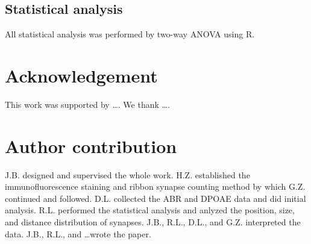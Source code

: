 \documentclass[11pt]{article}
\begin{document}
\subsection {Statistical analysis}
All statistical analysis was performed by two-way ANOVA using R\cite{Rcite2011}. 

\section{Acknowledgement}
This work was supported by \ldots. We thank \ldots.

\section{Author contribution}
J.B. designed and supervised the whole work. H.Z. established the immunofluorescence staining and ribbon synapse counting method by which G.Z. continued and followed. D.L. collected the ABR and DPOAE data and did initial analysis. R.L. performed the statistical analysis and anlyzed the position, size, and distance distribution of synapses. J.B., R.L., D.L., and G.Z. interpreted the data. J.B., R.L., and \ldots wrote the paper.


\end{document}
